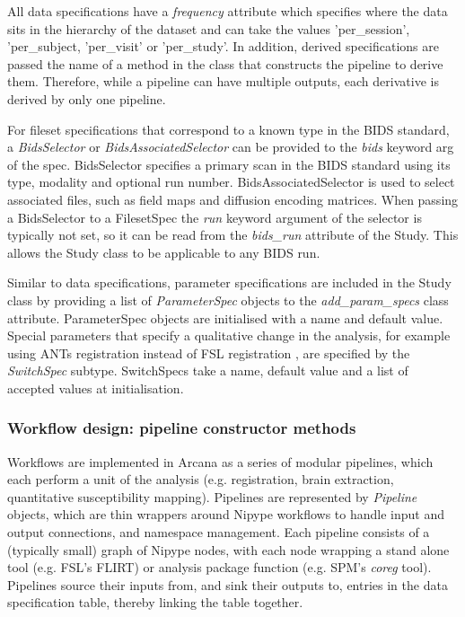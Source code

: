\documentclass[smallextended]{svjour3}       %
\begin{document}
All data specifications have a \emph{frequency} attribute which specifies
where the data sits in the hierarchy of the
dataset and can take the values 'per\_session',
'per\_subject, 'per\_visit' or 'per\_study'. In
addition, derived specifications are passed the name of a method in the
class that constructs the pipeline to derive them. Therefore, while a
pipeline can have multiple outputs, each derivative is derived by only
one pipeline.

For fileset specifications that correspond to a known type in the BIDS
standard, a \emph{BidsSelector} or \emph{BidsAssociatedSelector} can be
provided to the \emph{bids} keyword arg of the spec. BidsSelector
specifies a primary scan in the BIDS standard using its type, modality
and optional run number. BidsAssociatedSelector is used to select
associated files, such as field maps and diffusion encoding matrices.
When passing a BidsSelector to a FilesetSpec the \emph{run} keyword
argument of the selector is typically not set, so it can be read from
the \emph{bids\_run} attribute of the Study. This allows the Study class
to be applicable to any BIDS run.

Similar to data specifications, parameter specifications are included in
the Study class by providing a list of \emph{ParameterSpec} objects to
the \emph{add\_param\_specs} class attribute. ParameterSpec objects
are initialised with a name and default value. Special parameters that
specify a qualitative change in the analysis, for example using ANTs
registration \citep{avants_reproducible_2011} instead of FSL registration
\citep{smith_advances_2004}, are specified by the \emph{SwitchSpec} subtype.
SwitchSpecs take a name, default value and a list of accepted values at
initialisation.

\subsubsection*{Workflow design: pipeline constructor methods}
\label{sec:pipeline-constructors}

Workflows are implemented in Arcana as a series of modular pipelines, which
each perform a unit of the analysis (e.g. registration, brain
extraction, quantitative susceptibility mapping). Pipelines are represented by \emph{Pipeline} objects,
which are thin wrappers around Nipype workflows to handle input and output
connections, and namespace management. Each pipeline consists of a
(typically small) graph of Nipype nodes, with each node wrapping a stand alone tool
(e.g. FSL's FLIRT) or analysis package function (e.g. SPM's \emph{coreg}
tool). Pipelines source their inputs from, and sink their outputs to, entries
in the data specification table, thereby linking the table together.
\end{document}
